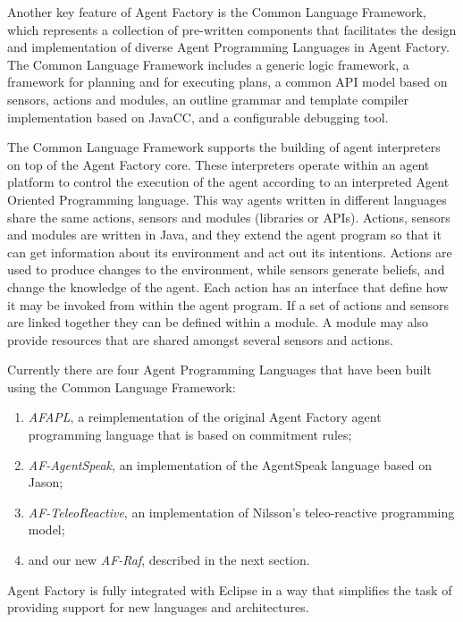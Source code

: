 \documentclass[a4paper,12pt,oneside,fleqn]{book} %
\theoremstyle{plain}
\theoremstyle{definition}
\theoremstyle{remark}
\begin{document}
Another key feature of Agent Factory is the Common Language Framework,
which represents a collection of pre-written components that facilitates
the design and implementation of diverse Agent Programming Languages in
Agent Factory\null. The Common Language Framework includes a generic logic
framework, a framework for planning and for executing plans, a common API
model based on sensors, actions and modules, an outline grammar and
template compiler implementation based on JavaCC, and a configurable
debugging tool.

The Common Language Framework supports the building of agent interpreters
on top of the Agent Factory core. These interpreters operate within an
agent platform to control the execution of the agent according to an
interpreted Agent Oriented Programming language. This way agents written in
different languages share the same actions, sensors and modules (libraries
or APIs). Actions, sensors and modules are written in Java, and they extend
the agent program so that it can get information about its environment and
act out its intentions. Actions are used to produce changes to the
environment, while sensors generate beliefs, and change the knowledge of
the agent. Each action has an interface that define how it may be invoked
from within the agent program. If a set of actions and sensors are linked
together they can be defined within a module. A module may also provide
resources that are shared amongst several sensors and actions. 

Currently there are four Agent Programming Languages that have been built
using the Common Language Framework:
\begin{enumerate}

\item \textit{AFAPL}, a reimplementation of the original Agent Factory
agent programming language that is based on commitment rules;

\item \textit{AF-AgentSpeak}, an implementation of the AgentSpeak language based on Jason;

\item \textit{AF-TeleoReactive}, an implementation of Nilsson's teleo-reactive
programming model;

\item and our new \textit{AF-Raf}, described in the next section.
\end{enumerate}

Agent Factory is fully integrated with Eclipse in a way that simplifies
the task of providing support for new languages and architectures.
\end{document}
